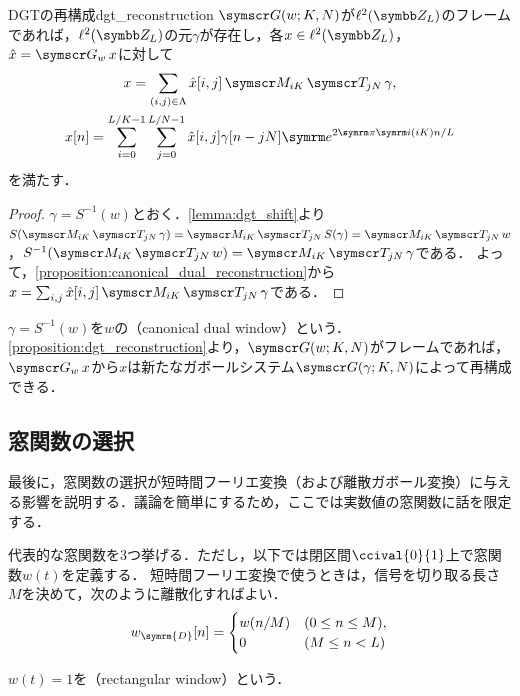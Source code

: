 \documentclass[../../main]{subfiles}
\begin{document}
\begin{proposition}{DGTの再構成}{dgt_reconstruction}
  \(\gaborsys{w}{K}{N}\)が\(\cycles{L}\)のフレームであれば，\(\cycles{L}\)の元\(\gamma\)が存在し，各\(x\in\cycles{L}\)，\(\hat{x}=\dgt{w}x\)に対して
  \begin{gather*}
    x = \sum_{(i,j)\in\Lambda}\hat{x}[i,j]\modulate{iK}\translate{jN}\gamma, \\
    x[n] = \sum_{i=0}^{L/K-1}\sum_{j=0}^{L/N-1}\hat{x}[i,j]\gamma[n-jN]\napr^{2\krez\iuni(iK)n/L}
  \end{gather*}
  を満たす．
\end{proposition}

\begin{proof}
  \(\gamma=S^{-1}(w)\)とおく．\cref{lemma:dgt_shift}より\(S(\modulate{iK}\translate{jN}\gamma)=\modulate{iK}\translate{jN}S(\gamma)=\modulate{iK}\translate{jN}w\)，\(S^{-1}(\modulate{iK}\translate{jN}w)=\modulate{iK}\translate{jN}\gamma\)である．
  よって，\cref{proposition:canonical_dual_reconstruction}から\(x=\sum_{i,j}\hat{x}[i,j]\modulate{iK}\translate{jN}\gamma\)である．
\end{proof}

\(\gamma=S^{-1}(w)\)を\(w\)の（canonical dual window）という．
\cref{proposition:dgt_reconstruction}より，\(\gaborsys{w}{K}{N}\)がフレームであれば，\(\dgt{w}x\)から\(x\)は新たなガボールシステム\(\gaborsys{\gamma}{K}{N}\)によって再構成できる．

\subsection{窓関数の選択}

最後に，窓関数の選択が短時間フーリエ変換（および離散ガボール変換）に与える影響を説明する．議論を簡単にするため，ここでは実数値の窓関数に話を限定する．

代表的な窓関数を3つ挙げる．ただし，以下では閉区間\(\ccival{0}{1}\)上で窓関数\(w(t)\)を定義する．
短時間フーリエ変換で使うときは，信号を切り取る長さ\(M\)を決めて，次のように離散化すればよい．
\[
  w_{\symrm{D}}[n] = \begin{cases}w(n/M) & (0\leq n\leq M), \\ 0 & (M\leq n<L)\end{cases}
\]

\begin{example}
  \(w(t)=1\)を（rectangular window）という．  
\end{example}
\end{document}
